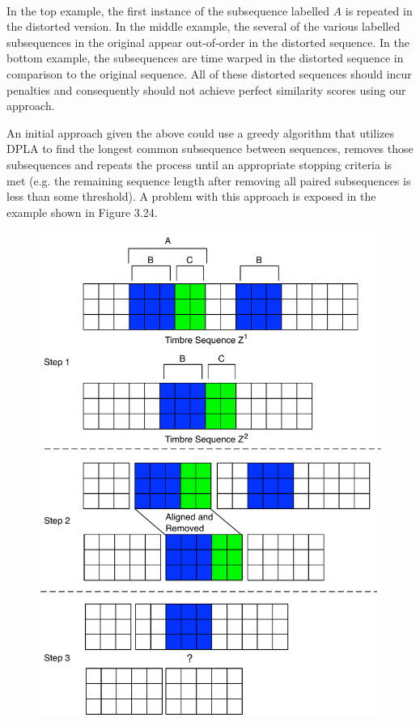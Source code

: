 \documentclass[a4paper,12pt]{report} 	%
\numberwithin{figure}{chapter}
\numberwithin{table}{chapter}
\numberwithin{equation}{chapter}
\begin{document}
\begin{flushleft}
\begin{figure}[!p]
\begin{center}
\end{center}
\end{figure}
\\
In the top example, the first instance of the subsequence labelled $A$ is repeated in the distorted version. In the middle example, the several of the various labelled subsequences in the original appear out-of-order in the distorted sequence. In the bottom example, the subsequences are time warped in the distorted sequence in comparison to the original sequence. All of these distorted sequences should incur penalties and consequently should not achieve perfect similarity scores using our approach.

An initial approach given the above could use a greedy algorithm that utilizes DPLA to find the longest common subsequence between sequences, removes those subsequences and repeats the process until an appropriate stopping criteria is met (e.g. the remaining sequence length after removing all paired subsequences is less than some threshold). A problem with this approach is exposed in the example shown in Figure 3.24. 
\begin{figure}[!p]
\begin{center}
\includegraphics[scale=0.6]{GreedyMatching1}

\end{center}
\end{figure}
\end{flushleft}
\end{document}
